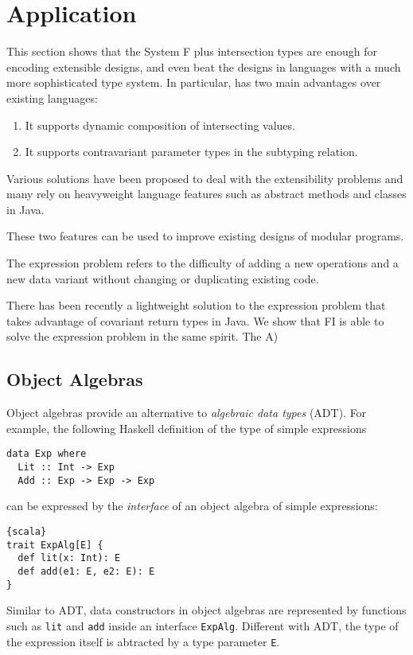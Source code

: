 \section{Application}




This section shows that the System F plus intersection types are enough for
encoding extensible designs, and even beat the designs in languages with a much
more sophisticated type system. In particular, \name has two main advantages
over existing languages:

\begin{enumerate}
\item It supports dynamic composition of intersecting values.
\item It supports contravariant parameter types in the subtyping relation.
\end{enumerate}

Various solutions have been proposed to deal with the extensibility problems and
many rely on heavyweight language features such as abstract methods and classes
in Java.

These two features can be used to improve existing designs of modular programs.


The expression problem refers to the difficulty of adding a new operations and a
new data variant without changing or duplicating existing code.

There has been recently a lightweight solution to the expression problem that
takes advantage of covariant return types in Java. We show that FI is able to
solve the expression problem in the same spirit. The
A)

\subsection{Object Algebras}

Object algebras provide an alternative to \emph{algebraic data types} (ADT). For example, the
following Haskell definition of the type of simple expressions
\begin{lstlisting}
data Exp where
  Lit :: Int -> Exp
  Add :: Exp -> Exp -> Exp
\end{lstlisting}
can be expressed by the \emph{interface} of an object algebra of simple expressions:
\begin{lstlisting}{scala}
trait ExpAlg[E] {
  def lit(x: Int): E
  def add(e1: E, e2: E): E
}
\end{lstlisting}
Similar to ADT, data constructors in object algebras are represented by functions such as
\lstinline{lit} and \lstinline{add} inside an interface \lstinline{ExpAlg}.
Different with ADT, the type of the expression itself is abtracted by a type
parameter \lstinline{E}.

